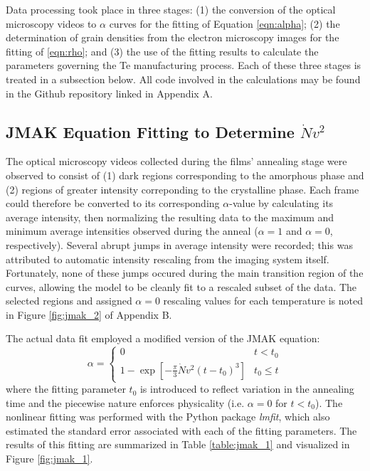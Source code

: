 Data processing took place in three stages: (1) the conversion of the optical microscopy videos to $\alpha$ curves for the fitting of Equation \ref{eqn:alpha}; (2) the determination of grain densities from the electron microscopy images for the fitting of \ref{eqn:rho}; and (3) the use of the fitting results to calculate the parameters governing the Te manufacturing process.  Each of these three stages is treated in a subsection below.  All code involved in the calculations may be found in the Github repository linked in Appendix A.

\subsection{JMAK Equation Fitting to Determine $\dot{N}v^2$}

The optical microscopy videos collected during the films' annealing stage were observed to consist of (1) dark regions corresponding to the amorphous phase and (2) regions of greater intensity correponding to the crystalline phase.  Each frame could therefore be converted to its corresponding $\alpha$-value by calculating its average intensity, then normalizing the resulting data to the maximum and minimum average intensities observed during the anneal ($\alpha = 1$ and $\alpha = 0$, respectively).  Several abrupt jumps in average intensity were recorded; this was attributed to automatic intensity rescaling from the imaging system itself.  Fortunately, none of these jumps occured during the main transition region of the curves, allowing the model to be cleanly fit to a rescaled subset of the data.  The selected regions and assigned $\alpha = 0$ rescaling values for each temperature is noted in Figure \ref{fig:jmak_2} of Appendix B.

The actual data fit employed a modified version of the JMAK equation:
%
	\begin{equation}
	\alpha =
	\begin{cases}
		0 & t < t_0 \\
		1 - \exp \left[ -\frac{\pi}{3} \dot{N} v^2 (t-t_0)^3 
			\right] & t_0 \leq t
	\end{cases}
	\end{equation}
%
where the fitting parameter $t_0$ is introduced to reflect variation in the annealing time and the piecewise nature enforces physicality (i.e. $\alpha = 0$ for $t < t_0$).  The nonlinear fitting was performed with the Python package \textit{lmfit}, which also estimated the standard error associated with each of the fitting parameters.  The results of this fitting are summarized in Table \ref{table:jmak_1} and visualized in Figure \ref{fig:jmak_1}.
	

